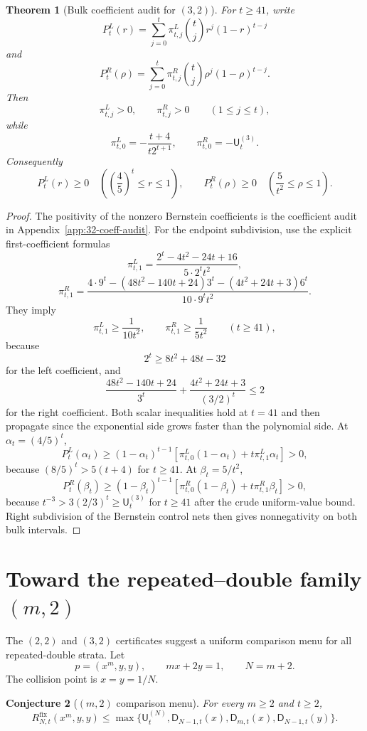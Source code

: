 \documentclass[11pt]{article}
\newtheorem{theorem}{Theorem}[section]
\newtheorem{conjecture}[theorem]{Conjecture}
\theoremstyle{definition}
\newcommand{\fix}{\mathrm{fix}}
\begin{document}
\begin{theorem}[Bulk coefficient audit for $(3,2)$]\label{thm:32-bulk-audit}
For $t\ge41$, write
\[
  P^L_t(r)=\sum_{j=0}^t\pi^L_{t,j}\binom tj r^j(1-r)^{t-j}
\]
and
\[
  P^R_t(\rho)=\sum_{j=0}^t\pi^R_{t,j}\binom tj \rho^j(1-\rho)^{t-j}.
\]
Then
\[
  \pi^L_{t,j}>0,
  \qquad
  \pi^R_{t,j}>0
  \qquad(1\le j\le t),
\]
while
\[
  \pi^L_{t,0}=-\frac{t+4}{t2^{t+1}},
  \qquad
  \pi^R_{t,0}=-\mathsf U^{(3)}_t.
\]
Consequently
\[
  P^L_t(r)\ge0
  \quad\left(\left(\frac45\right)^t\le r\le1\right),
  \qquad
  P^R_t(\rho)\ge0
  \quad\left(\frac5{t^2}\le\rho\le1\right).
\]
\end{theorem}

\begin{proof}
The positivity of the nonzero Bernstein coefficients is the coefficient
audit in Appendix~\ref{app:32-coeff-audit}.  For the endpoint subdivision,
use the explicit first-coefficient formulas
\[
  \pi^L_{t,1}
  =\frac{2^t-4t^2-24t+16}{5\cdot 2^t t^2},
\]
\[
  \pi^R_{t,1}
  =\frac{4\cdot9^t-(48t^2-140t+24)3^t
          -(4t^2+24t+3)6^t}{10\cdot9^t t^2}.
\]
They imply
\[
  \pi^L_{t,1}\ge\frac1{10t^2},
  \qquad
  \pi^R_{t,1}\ge\frac1{5t^2}
  \qquad(t\ge41),
\]
because
\[
  2^t\ge8t^2+48t-32
\]
for the left coefficient, and
\[
  \frac{48t^2-140t+24}{3^t}
  +\frac{4t^2+24t+3}{(3/2)^t}\le2
\]
for the right coefficient.  Both scalar inequalities hold at $t=41$ and
then propagate since the exponential side grows faster than the polynomial
side.
At $\alpha_t=(4/5)^t$,
\[
P^L_t(\alpha_t)
\ge(1-\alpha_t)^{t-1}
\left[\pi^L_{t,0}(1-\alpha_t)+t\pi^L_{t,1}\alpha_t\right]>0,
\]
because $(8/5)^t>5(t+4)$ for $t\ge41$.  At $\beta_t=5/t^2$,
\[
P^R_t(\beta_t)
\ge(1-\beta_t)^{t-1}
\left[\pi^R_{t,0}(1-\beta_t)+t\pi^R_{t,1}\beta_t\right]>0,
\]
because $t^{-3}>3(2/3)^t\ge \mathsf U^{(3)}_t$ for $t\ge41$ after the
crude uniform-value bound.  Right subdivision of the Bernstein control nets
then gives nonnegativity on both bulk intervals.
\end{proof}

\section{Toward the repeated--double family $(m,2)$}\label{sec:m2}

The $(2,2)$ and $(3,2)$ certificates suggest a uniform comparison menu for
all repeated-double strata.  Let
\[
  p=(x^m,y,y),
  \qquad mx+2y=1,
  \qquad N=m+2.
\]
The collision point is $x=y=1/N$.

\begin{conjecture}[$(m,2)$ comparison menu]\label{conj:m2-menu}
For every $m\ge2$ and $t\ge2$,
\[
  R^{\fix}_{N,t}(x^m,y,y)
  \le
  \max\{\mathsf U^{(N)}_t,
          \mathsf D_{N-1,t}(x),
          \mathsf D_{m,t}(x),
          \mathsf D_{N-1,t}(y)\}.
\]
\end{conjecture}
\end{document}
